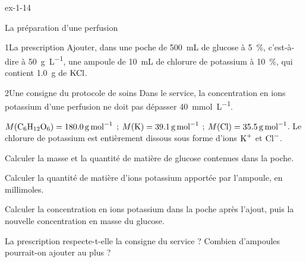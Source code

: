\begin{blocLivre}{ex-1-14}
\begin{exercice}[3]{La préparation d'une perfusion}
\begin{docu}{1}{La prescription}
Ajouter, dans une poche de \qty{500}{mL} de glucose à 5~\%, c'est-à-dire à \qty{50}{g.L^{-1}}, une ampoule de \qty{10}{mL} de chlorure de potassium à
10~\%, qui contient \qty{1,0}{g} de $\ce{KCl}$.
\end{docu}
\begin{docu}{2}{Une consigne du protocole de soins}
Dans le service, la concentration en ions potassium d'une perfusion ne doit pas dépasser \qty{40}{mmol.L^{-1}}.
\end{docu}
\begin{donnees}
$M(\ce{C6H12O6})=\qty{180,0}{g.mol^{-1}}$ ; $M(\ce{K})=\qty{39,1}{g.mol^{-1}}$ ; $M(\ce{Cl})=\qty{35,5}{g.mol^{-1}}$. Le chlorure de potassium est entièrement
dissous sous forme d'ions $\ce{K+}$ et $\ce{Cl-}$.
\end{donnees}
\begin{questions}
\item Calculer la masse et la quantité de matière de glucose contenues dans la poche.
\item Calculer la quantité de matière d'ions potassium apportée par l'ampoule, en millimoles.
\item Calculer la concentration en ions potassium dans la poche après l'ajout, puis la nouvelle concentration en masse du
glucose.
\item \initiative La prescription respecte-t-elle la consigne du service ? Combien d'ampoules pourrait-on ajouter au plus ?
\end{questions}
\end{exercice}
\end{blocLivre}
